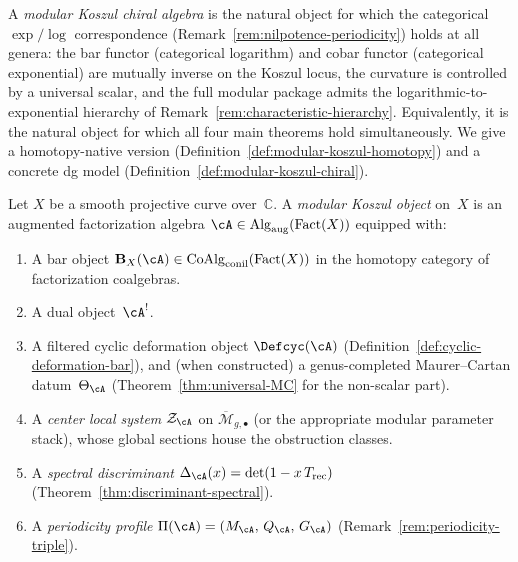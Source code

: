 A \emph{modular Koszul chiral algebra} is the natural object for
which the categorical $\exp/\log$ correspondence
(Remark~\ref{rem:nilpotence-periodicity}) holds at all genera:
the bar functor (categorical logarithm) and cobar functor
(categorical exponential) are mutually inverse on the Koszul locus,
the curvature is controlled by a universal scalar, and the full
modular package admits the logarithmic-to-exponential hierarchy of
Remark~\ref{rem:characteristic-hierarchy}.  Equivalently, it is
the natural object for which all four main theorems hold
simultaneously.  We give a homotopy-native version
(Definition~\ref{def:modular-koszul-homotopy}) and a concrete dg model
(Definition~\ref{def:modular-koszul-chiral}).

\begin{definition}\label{def:modular-koszul-homotopy}
Let $X$ be a smooth projective curve over~$\mathbb{C}$.
A \emph{modular Koszul object} on~$X$ is an augmented factorization algebra
$\cA \in \operatorname{Alg}_{\mathrm{aug}}(\operatorname{Fact}(X))$
equipped with:
\begin{enumerate}[label=\textup{(D\arabic*$_\infty$)}]
\item\label{D:bar-htpy}
A bar object
$\mathbf{B}_X(\cA) \in \operatorname{CoAlg}_{\mathrm{conil}}(\operatorname{Fact}(X))$
in the homotopy category of factorization coalgebras.

\item\label{D:dual-htpy}
A dual object~$\cA^!$.

\item\label{D:deformation-htpy}
A filtered cyclic deformation object
$\Defcyc(\cA)$
(Definition~\ref{def:cyclic-deformation-bar}),
and (when constructed)
a genus-completed Maurer--Cartan datum~$\Theta_{\cA}$
\textup{(}Theorem~\textup{\ref{thm:universal-MC}} for the
non-scalar part\textup{)}.

\item\label{D:center-htpy}
A \emph{center local system}
$\mathcal{Z}_{\cA}$ on $\overline{\mathcal{M}}_{g,\bullet}$
\textup{(}or the appropriate modular parameter stack\textup{)},
whose global sections house the obstruction classes.

\item\label{D:discriminant-htpy}
A \emph{spectral discriminant}
$\Delta_{\cA}(x) = \det(1 - x\, T_{\mathrm{rec}})$
\textup{(}Theorem~\textup{\ref{thm:discriminant-spectral})}.

\item\label{D:periodicity-htpy}
A \emph{periodicity profile}
$\Pi(\cA) = (M_{\cA},\, Q_{\cA},\, G_{\cA})$
\textup{(}Remark~\textup{\ref{rem:periodicity-triple})}.
\end{enumerate}


\end{definition}
